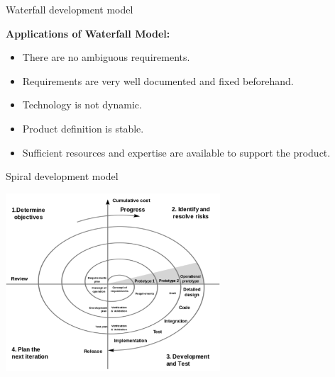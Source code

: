 \documentclass{beamer}
\begin{document}
\begin{frame}{\centerline{Waterfall development model}}

\textbf{Applications of Waterfall Model:}
\begin{itemize}

\item  There are no ambiguous requirements.

\item  Requirements are very well documented and fixed beforehand.

\item  Technology is not dynamic.

\item  Product definition is stable.

\item  Sufficient resources and expertise are available to support the product.
\end{itemize}

\end{frame}
\begin{frame}{\centerline{Spiral development model}}
\begin{center}
\includegraphics[width=80mm]{A2022.IDSEPC.ProcessoDiProduzione/img-03.png}
\end{center}


\end{frame}
\end{document}
